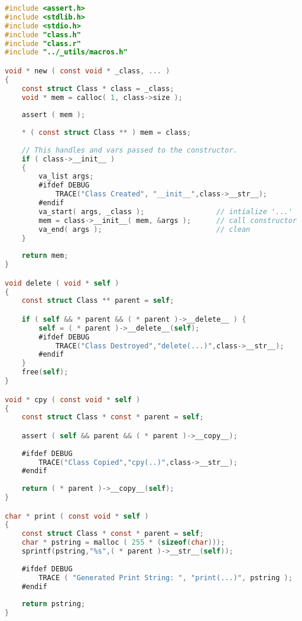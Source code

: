 \documentclass[fancychapters]{report}   	%
\begin{document}
\begin{lstlisting}[language=C,caption={class.c}]
#include <assert.h>
#include <stdlib.h>
#include <stdio.h>
#include "class.h"
#include "class.r"
#include "../_utils/macros.h"

void * new ( const void * _class, ... )
{
    const struct Class * class = _class;
    void * mem = calloc( 1, class->size );
    
    assert ( mem );
    
    * ( const struct Class ** ) mem = class;
    
    // This handles and vars passed to the constructor.
    if ( class->__init__ )
    {
        va_list args;
        #ifdef DEBUG
            TRACE("Class Created", "__init__",class->__str__);
        #endif
        va_start( args, _class );                 // intialize '...'
	    mem = class->__init__( mem, &args );      // call constructor
        va_end( args );                           // clean
    }
    
    return mem;
}

void delete ( void * self )
{
    const struct Class ** parent = self;

    if ( self && * parent && ( * parent )->__delete__ ) {
        self = ( * parent )->__delete__(self);
        #ifdef DEBUG
            TRACE("Class Destroyed","delete(...)",class->__str__);
        #endif
    } 
    free(self);
}

void * cpy ( const void * self )
{
    const struct Class * const * parent = self;

    assert ( self && parent && ( * parent )->__copy__);
    
    #ifdef DEBUG
        TRACE("Class Copied","cpy(..)",class->__str__);
    #endif
    
    return ( * parent )->__copy__(self);
}

char * print ( const void * self )
{
    const struct Class * const * parent = self;
    char * pstring = malloc ( 255 * (sizeof(char)));
    sprintf(pstring,"%s",( * parent )->__str__(self));
    
    #ifdef DEBUG
        TRACE ( "Generated Print String: ", "print(...)", pstring );
    #endif
    
    return pstring;
}
\end{lstlisting}
\end{document}

